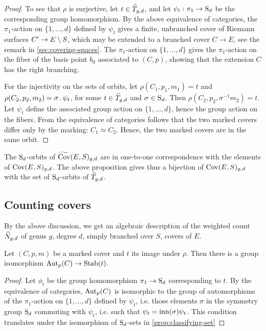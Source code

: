 \begin{proof}
 To see that $\rho$ is surjective, let $t\in\widehat{T}_{g,d}$, and let $\psi_t:\pi_1\to\operatorname{S}_d$ be the corresponding group homomorphism. By the above equivalence of categories, the $\pi_1$-action on $\{1,\dotsc,d\}$ defined by $\psi_t$ gives a finite, unbranched cover of Riemann surfaces $C'\to E\setminus S$, which may be extended to a branched cover $C\to E$, see the remark in \ref{sec:covering-spaces}. The $\pi_1$-action on $\{1,\dotsc,d\}$ gives the $\pi_1$-action on the fiber of the basis point $b_0$ associated to $(C,p)$, showing that the extension $C$ has the right branching.
 
 For the injectivity on the sets of orbits, let $\rho(C_1,p_1,m_1)=t$ and $\rho(C_2,p_2,m_2)=\sigma\,.\, \psi_t$, for some $t\in \widehat{T}_{g,d}$ and $\sigma \in \operatorname{S}_d$. Then $\rho(C_2,p_2,\sigma^{-1}m_2)=t$. Let $\psi_t$ define the associated group action on $\{1,\dotsc,d\}$, hence the group action on the fibers. From the equivalence of categories follows that the two marked covers differ only by the marking: $C_1\simeq C_2$. Hence, the two marked covers are in the same orbit.
\end{proof}

\begin{rmk}
 The $\operatorname{S}_d$-orbits of $\widetilde{\operatorname{Cov}}(E,S)_{g,d}$ are in one-to-one correspondence with the elements of $\operatorname{Cov}(E,S)_{g,d}$. The above proposition gives thus a bijection of $\operatorname{Cov}(E,S)_{g,d}$ with the set of $\operatorname{S}_d$-orbits of $\widehat{T}_{g,d}$.
\end{rmk}


\subsection{Counting covers}

By the above discussion, we get an algebraic description of the weighted count $\widehat{N}_{g,d}$ of genus $g$, degree $d$, simply branched over $S$, covers of $E$.

\begin{prop} \label{prop:correspondence-automorphism-group}
 Let $(C,p,m)$ be a marked cover and $t$ its image under $\rho$. Then there is a group isomorphism $\operatorname{Aut}_p(C)\to \operatorname{Stab}(t)$.
\end{prop}

\begin{proof}
 Let $\phi_t$ be the group homomorphism $\pi_1\to \operatorname{S}_d$ corresponding to $t$. By the equivalence of categories, $\operatorname{Aut}_p(C)$ is isomorphic to the group of automorphisms of the $\pi_1$-action on $\{1,\dotsc,d\}$ defined by $\psi_t$, i.e. those elements $\sigma$ in the symmetry group $\operatorname{S}_d$ commuting with $\psi_t$, i.e. such that $\psi_t = \operatorname{inn}(\sigma)\psi_t$. This condition translates under the isomorphism of $\operatorname{S}_d$-sets in \ref{prop:classifying-set}
\end{proof}

